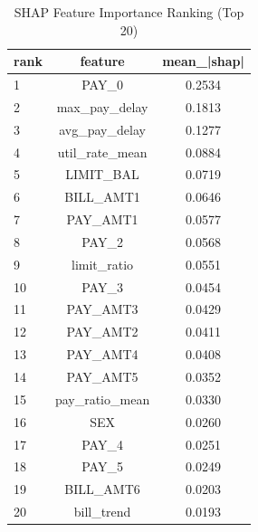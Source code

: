 \begin{table}
\centering
\caption{SHAP Feature Importance Ranking (Top 20)}
\label{tab:shap_ranking}
\begin{tabular}{lcc}
\toprule
rank & feature & mean_|shap| \\
\midrule
1 & PAY_0 & 0.2534 \\
2 & max_pay_delay & 0.1813 \\
3 & avg_pay_delay & 0.1277 \\
4 & util_rate_mean & 0.0884 \\
5 & LIMIT_BAL & 0.0719 \\
6 & BILL_AMT1 & 0.0646 \\
7 & PAY_AMT1 & 0.0577 \\
8 & PAY_2 & 0.0568 \\
9 & limit_ratio & 0.0551 \\
10 & PAY_3 & 0.0454 \\
11 & PAY_AMT3 & 0.0429 \\
12 & PAY_AMT2 & 0.0411 \\
13 & PAY_AMT4 & 0.0408 \\
14 & PAY_AMT5 & 0.0352 \\
15 & pay_ratio_mean & 0.0330 \\
16 & SEX & 0.0260 \\
17 & PAY_4 & 0.0251 \\
18 & PAY_5 & 0.0249 \\
19 & BILL_AMT6 & 0.0203 \\
20 & bill_trend & 0.0193 \\
\bottomrule
\end{tabular}
\end{table}
